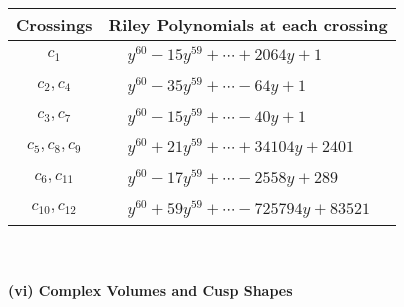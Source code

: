 \documentclass[1p]{elsarticle_modified}
\theoremstyle{definition}
\begin{document}
\begin{tabular}{m{50pt}|m{274pt}}
Crossings & \hspace{64pt}Riley Polynomials at each crossing \\
\hline $$\begin{aligned}c_{1}\end{aligned}$$&$\begin{aligned}
&y^{60}-15 y^{59}+\cdots+2064 y+1
\end{aligned}$\\
\hline $$\begin{aligned}c_{2},c_{4}\end{aligned}$$&$\begin{aligned}
&y^{60}-35 y^{59}+\cdots-64 y+1
\end{aligned}$\\
\hline $$\begin{aligned}c_{3},c_{7}\end{aligned}$$&$\begin{aligned}
&y^{60}-15 y^{59}+\cdots-40 y+1
\end{aligned}$\\
\hline $$\begin{aligned}c_{5},c_{8},c_{9}\end{aligned}$$&$\begin{aligned}
&y^{60}+21 y^{59}+\cdots+34104 y+2401
\end{aligned}$\\
\hline $$\begin{aligned}c_{6},c_{11}\end{aligned}$$&$\begin{aligned}
&y^{60}-17 y^{59}+\cdots-2558 y+289
\end{aligned}$\\
\hline $$\begin{aligned}c_{10},c_{12}\end{aligned}$$&$\begin{aligned}
&y^{60}+59 y^{59}+\cdots-725794 y+83521
\end{aligned}$\\
\hline
\end{tabular}\\~\\
\newpage\flushleft \textbf{(vi) Complex Volumes and Cusp Shapes}
\end{document}
